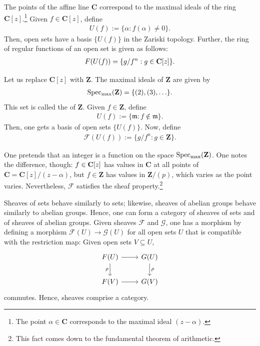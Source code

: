 \documentclass [11 pt, oneside] {article}
\begin{document}
\begin{example}[ ]\label{}\text{}
The points of the affine line $\mathbf{C}$ correspond to the maximal ideals of the ring $\mathbf{C}[z]$.\footnote{The point $\alpha\in \mathbf{C}$ corresponds to the maximal ideal $(z-\alpha)$.} Given $f\in \mathbf{C}[z]$, define
\begin{align*}
	U(f) := \{\alpha : f(\alpha)\ne 0\}.
\end{align*}
Then, open sets have a basis $\{U(f)\}$ in the Zariski topology. Further, the ring of regular functions of an open set is given as follows: 
\begin{align*}
	\relax{F}(U(f)) = \{g/f^n: g\in \mathbf C[z]\}.
\end{align*}

Let us replace $\mathbf{C}[z]$ with $\mathbf{Z}$. The maximal ideals of $\mathbf{Z}$ are given by
\begin{align*}
	\operatorname{Spec\textsubscript{max}}(\mathbf{Z}) = \{(2),  (3),\hdots\}.
\end{align*}
This set is called the  of $\mathbf{Z}$. Given $f\in \mathbf{Z}$, define 
\begin{align*}
	U(f) := \{\mathfrak{m}: f\notin  \mathfrak{m}\}.
\end{align*}
Then, one gets a basis of open sets $\{U(f)\}$. Now, define
\begin{align*}
	\mathscr{F}(U(f)) := \{ g/f^n : g\in \mathbf{Z}\}.
\end{align*}

One pretends that an integer is a function on the space $\operatorname{Spec\textsubscript{max}}(\mathbf{Z})$. One notes the difference, though: $f\in \mathbf C[z]$ has values in $\mathbf{C}$ at all points of $\mathbf{C} = \mathbf{C}[z]/(z-\alpha)$, but $f\in \mathbf{Z}$ has values in $\mathbf{Z}/(p)$, which varies as the point varies. Nevertheless, $\mathscr{F}$ satisfies the sheaf property.\footnote{This fact comes down to the fundamental theorem of arithmetic.}
\end{example}

Sheaves of sets behave similarly to sets; likewise, sheaves of abelian groups behave similarly to abelian groups. Hence, one can form a category of sheaves of sets and of sheaves of abelian groups. Given sheaves $\mathscr{F}$ and $\mathscr{G}$, one has a morphism by defining a morphism $\mathscr{F}(U) \longrightarrow \mathscr{G}(U)$ for all open sets $U$ that is compatible with the restriction map: Given open sets $V\subseteq U$,
\[
\begin{tikzcd}
	\mathscr{F}(U)\ar[d,"\rho", swap] \ar[r]&  \mathscr{G}(U)  \ar[d,"\rho"] \\
	\mathscr{F}(V) \ar[r]&  \mathscr{G}(V)
\end{tikzcd}
\]
commutes. Hence, sheaves comprise a category.
\end{document}
